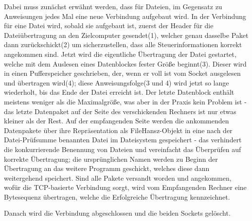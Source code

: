 Dabei muss zunächst erwähnt werden, dass für Dateien, im Gegensatz zu Anweisungen jedes Mal eine neue Verbindung aufgebaut wird.
In der Verbindung für eine Datei wird, sobald sie aufgebaut ist, zuerst der Header für die Dateiübertragung an den Zielcomputer gesendet(1), welcher genau dasselbe Paket dann zurückschickt(2) um sicherzustellen, dass alle Steuerinformationen korrekt angekommen sind.
Jetzt wird die eigentliche Übertragung der Datei gestartet, welche mit dem Auslesen eines Datenblockes fester Größe beginnt(3).
Dieser wird in einen Pufferspeicher geschrieben, der, wenn er voll ist vom Socket ausgelesen und übertragen wird(4); diese Anweisungsfolge(3 und 4) wird jetzt so lange wiederholt, bis das Ende der Datei erreicht ist.
Der letzte Datenblock enthält meistens weniger als die Maximalgröße, was aber in der Praxis kein Problem ist - das letzte Datenpaket auf der Seite des verschickenden Rechners ist nur etwas kleiner als der Rest.
Auf der empfangenden Seite werden die ankommenden Datenpakete über ihre Repräsentation als FileHansz-Objekt in eine nach der Datei-Prüfsumme benannten Datei im Dateisystem gespeichert - das verhindert die konkurrierende Benennung von Dateien und vereinfacht das Überprüfen auf korrekte Übertragung; die ursprünglichen Namen werden zu Beginn der Übertragung an das weitere Programm geschickt, welches diese dann weitergehend speichert.
Sind alle Pakete versandt worden und angekommen, wofür die TCP-basierte Verbindung sorgt, wird vom Empfangenden Rechner eine Bytesequenz übertragen, welche die Erfolgreiche Übertragung kennzeichnet.\par
Danach wird die Verbindung abgeschlossen und die beiden Sockets gelöscht.\\\\
%